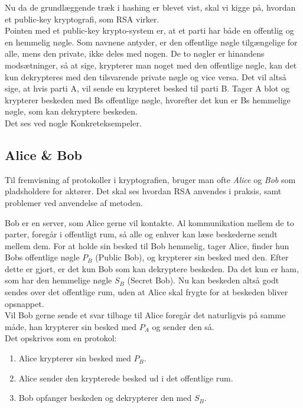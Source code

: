 Nu da de grundlæggende træk i hashing er blevet vist, skal vi kigge på, hvordan et public-key kryptografi, som RSA virker.\\
Pointen med et public-key krypto-system er, at et parti har både en offentlig og en hemmelig nøgle.
Som navnene antyder, er den offentlige nøgle tilgængelige for alle, mens den private, ikke deles med nogen.
De to nøgler er hinandens modsætninger, så at sige, krypterer man noget med den offentlige nøgle, kan det kun dekrypteres med den tilsvarende private nøgle og vice versa.
Det vil altså sige, at hvis parti A, vil sende en krypteret besked til parti B. Tager A blot og krypterer beskeden med Bs offentlige nøgle, hvorefter det kun er Bs hemmelige nøgle, som kan dekryptere beskeden.\\
Det ses ved nogle Konkreteksempeler.

\subsection{Alice \& Bob}
Til fremvisning af protokoller i kryptografien, bruger man ofte \emph{Alice} og \emph{Bob} som pladsholdere for aktører.
Det skal ses hvordan RSA anvendes i praksis, samt problemer ved anvendelse af metoden.

\begin{eks}
    \label{genrsa}
    Bob er en server, som Alice gerne vil kontakte.
    Al kommunikation mellem de to parter, foregår i offentligt rum, så alle og enhver kan læse beskederne sendt mellem dem.
    For at holde sin besked til Bob hemmelig, tager Alice, finder hun Bobs offentlige nøgle \(P_B\) (Public Bob), og krypterer sin besked med den.
    Efter dette er gjort, er det kun Bob som kan dekryptere beskeden. Da det kun er ham, som har den hemmelige nøgle \(S_B\) (Secret Bob).
    Nu kan beskeden altså godt sendes over det offentlige rum, uden at Alice skal frygte for at beskeden bliver opsnappet.\\
    Vil Bob gerne sende et svar tilbage til Alice foregår det naturligvis på samme måde, han krypterer sin besked med \(P_A\) og sender den så.\\

    Det opskrives som en protokol:
    \begin{enumerate}%
        \item Alice krypterer sin besked med \(P_B\).
        \item Alice sender den krypterede besked ud i det offentlige rum.
        \item Bob opfanger beskeden og dekrypterer den med \(S_B\).
    \end{enumerate}
\end{eks}

